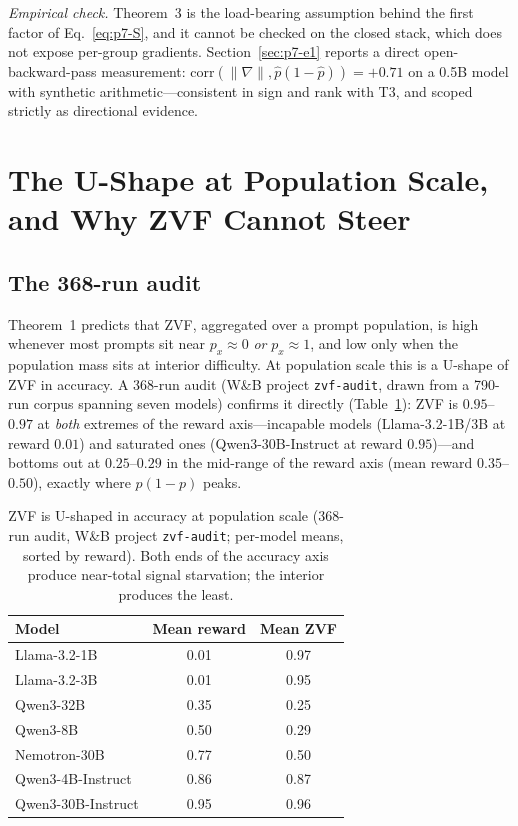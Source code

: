 \documentclass{article}
\begin{document}
\emph{Empirical check.} Theorem~3 is the load-bearing assumption behind the
first factor of Eq.~\eqref{eq:p7-S}, and it cannot be checked on the closed
stack, which does not expose per-group gradients. Section~\ref{sec:p7-e1}
reports a direct open-backward-pass measurement:
$\mathrm{corr}(\|\nabla\|, \hat p(1-\hat p)) = +0.71$ on a 0.5B model with
synthetic arithmetic---consistent in sign and rank with T3, and scoped
strictly as directional evidence.
 \section{The U-Shape at Population Scale, and Why ZVF Cannot Steer}
\label{sec:p7-ushape}

\subsection{The 368-run audit}
\label{sec:p7-audit}
Theorem~1 predicts that ZVF, aggregated over a prompt population, is high
whenever most prompts sit near $p_x \approx 0$ \emph{or} $p_x \approx 1$, and
low only when the population mass sits at interior difficulty. At population
scale this is a U-shape of ZVF in accuracy. A 368-run audit (W\&B project
\texttt{zvf-audit}, drawn from a 790-run corpus spanning seven models)
confirms it directly (Table~\ref{tab:p7-ushape}): ZVF is
$0.95$--$0.97$ at \emph{both} extremes of the reward axis---incapable models
(Llama-3.2-1B/3B at reward $0.01$) and saturated ones (Qwen3-30B-Instruct at
reward $0.95$)---and bottoms out at $0.25$--$0.29$ in the mid-range of the
reward axis (mean reward $0.35$--$0.50$), exactly where $p(1-p)$ peaks.

\begin{table}[t]
\centering
\caption{ZVF is U-shaped in accuracy at population scale (368-run audit,
W\&B project \texttt{zvf-audit}; per-model means, sorted by reward). Both
ends of the accuracy axis produce near-total signal starvation; the
interior produces the least.}
\label{tab:p7-ushape}
\begin{tabular}{lcc}
\toprule
Model & Mean reward & Mean ZVF \\
\midrule
Llama-3.2-1B        & 0.01 & 0.97 \\
Llama-3.2-3B        & 0.01 & 0.95 \\
Qwen3-32B           & 0.35 & 0.25 \\
Qwen3-8B            & 0.50 & 0.29 \\
Nemotron-30B        & 0.77 & 0.50 \\
Qwen3-4B-Instruct   & 0.86 & 0.87 \\
Qwen3-30B-Instruct  & 0.95 & 0.96 \\
\bottomrule
\end{tabular}
\end{table}
\end{document}
